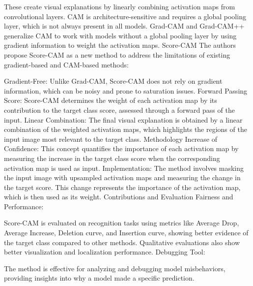 These create visual explanations by linearly combining activation maps from convolutional layers.
CAM is architecture-sensitive and requires a global pooling layer, which is not always present in all models.
Grad-CAM and Grad-CAM++ generalize CAM to work with models without a global pooling layer by using gradient information to weight the activation maps.
Score-CAM
The authors propose Score-CAM as a new method to address the limitations of existing gradient-based and CAM-based methods:

Gradient-Free: Unlike Grad-CAM, Score-CAM does not rely on gradient information, which can be noisy and prone to saturation issues.
Forward Passing Score: Score-CAM determines the weight of each activation map by its contribution to the target class score, assessed through a forward pass of the input.
Linear Combination: The final visual explanation is obtained by a linear combination of the weighted activation maps, which highlights the regions of the input image most relevant to the target class.
Methodology
Increase of Confidence: This concept quantifies the importance of each activation map by measuring the increase in the target class score when the corresponding activation map is used as input.
Implementation:
The method involves masking the input image with upsampled activation maps and measuring the change in the target score.
This change represents the importance of the activation map, which is then used as its weight.
Contributions and Evaluation
Fairness and Performance:

Score-CAM is evaluated on recognition tasks using metrics like Average Drop, Average Increase, Deletion curve, and Insertion curve, showing better evidence of the target class compared to other methods.
Qualitative evaluations also show better visualization and localization performance.
Debugging Tool:

The method is effective for analyzing and debugging model misbehaviors, providing insights into why a model made a specific prediction.

